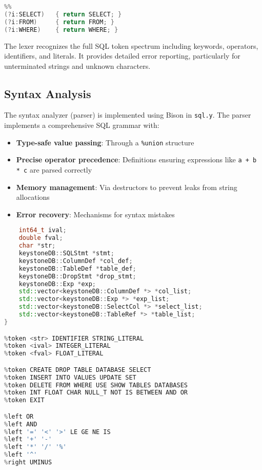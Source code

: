 \documentclass[12pt,a4paper]{article}
\begin{document}
\begin{lstlisting}[language=C++,caption=Example of a lexer rule for SQL keywords]
%option reentrant
%%
(?i:SELECT)   { return SELECT; }
(?i:FROM)     { return FROM; }
(?i:WHERE)    { return WHERE; }
\end{lstlisting}

The lexer recognizes the full SQL token spectrum including keywords, operators, identifiers, and literals. It provides detailed error reporting, particularly for unterminated strings and unknown characters.

\subsection{Syntax Analysis}
The syntax analyzer (parser) is implemented using Bison in \texttt{sql.y}. The parser implements a comprehensive SQL grammar with:

\begin{itemize}
    \item \textbf{Type-safe value passing}: Through a \texttt{\%union} structure
    \item \textbf{Precise operator precedence}: Definitions ensuring expressions like \texttt{a + b * c} are parsed correctly
    \item \textbf{Memory management}: Via destructors to prevent leaks from string allocations
    \item \textbf{Error recovery}: Mechanisms for syntax mistakes
\end{itemize}

\begin{lstlisting}[language=C++,caption=Example of union definition and token types]
%union {
    int64_t ival;
    double fval;
    char *str;
    keystoneDB::SQLStmt *stmt;
    keystoneDB::ColumnDef *col_def;
    keystoneDB::TableDef *table_def;
    keystoneDB::DropStmt *drop_stmt;
    keystoneDB::Exp *exp;
    std::vector<keystoneDB::ColumnDef *> *col_list;
    std::vector<keystoneDB::Exp *> *exp_list;
    std::vector<keystoneDB::SelectCol *> *select_list;
    std::vector<keystoneDB::TableRef *> *table_list;
}

%token <str> IDENTIFIER STRING_LITERAL
%token <ival> INTEGER_LITERAL
%token <fval> FLOAT_LITERAL

%token CREATE DROP TABLE DATABASE SELECT
%token INSERT INTO VALUES UPDATE SET
%token DELETE FROM WHERE USE SHOW TABLES DATABASES
%token INT FLOAT CHAR NULL_T NOT IS BETWEEN AND OR
%token EXIT

%left OR
%left AND
%left '=' '<' '>' LE GE NE IS
%left '+' '-'
%left '*' '/' '%'
%left '^'
%right UMINUS
\end{lstlisting}
\end{document}
